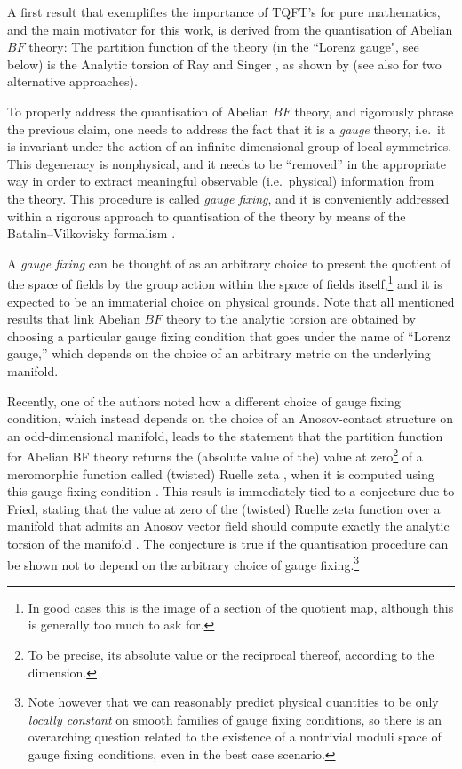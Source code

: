 \documentclass[reqno]{amsart}
\theoremstyle{definition}
\theoremstyle{remark}
\begin{document}
A first result that exemplifies the importance of TQFT's for pure mathematics, and the main motivator for this work, is derived from the quantisation of Abelian $BF$ theory:  The partition function of the theory (in the ``Lorenz gauge", see below) is the Analytic torsion of Ray and Singer \cite{ray_singer}, as shown by \cite{schwarz1,schwarz2} (see also \cite{cattaneo2017cellular,hadfield_kandel_schiavina} for two alternative approaches).

To properly address the quantisation of Abelian $BF$ theory, and rigorously phrase the previous claim, one needs to address the fact that it is a \emph{gauge} theory, i.e.\ it is invariant under the action of an infinite dimensional group of local symmetries. This degeneracy is nonphysical, and it needs to be ``removed'' in the appropriate way in order to extract meaningful observable (i.e.\ physical) information from the theory. This procedure is called \emph{gauge fixing}, and it is conveniently addressed within a rigorous approach to quantisation of the theory by means of the Batalin--Vilkovisky formalism \cite{BV81,BV83}. 

A \emph{gauge fixing} can be thought of as an arbitrary choice to present the quotient of the space of fields by the group action within the space of fields itself,\footnote{In good cases this is the image of a section of the quotient map, although this is generally too much to ask for.} and it is expected to be an immaterial choice on physical grounds. Note that all mentioned results that link Abelian $BF$ theory to the analytic torsion are obtained by choosing a particular gauge fixing condition that goes under the name of ``Lorenz gauge,'' which depends on the choice of an arbitrary metric on the underlying manifold.

Recently, one of the authors noted how a different choice of gauge fixing condition, which instead depends on the choice of an Anosov-contact structure on an odd-dimensional manifold, leads to the statement that the partition function for Abelian BF theory returns the (absolute value of the) value at zero\footnote{To be precise, its absolute value or the reciprocal thereof, according to the dimension.} of a meromorphic function called (twisted) Ruelle zeta \cite{ruelle}, when it is computed using this gauge fixing condition \cite{hadfield_kandel_schiavina}. This result is immediately tied to a conjecture due to Fried, stating that the value at zero of the (twisted) Ruelle zeta function over a manifold that admits an Anosov vector field should compute exactly the analytic torsion of the manifold \cite{fried,fried1987lefschetz}. The conjecture is true if the quantisation procedure can be shown not to depend on the arbitrary choice of gauge fixing.\footnote{Note however that we can reasonably predict physical quantities to be only \emph{locally constant} on smooth families of gauge fixing conditions, so there is an overarching question related to the existence of a nontrivial moduli space of gauge fixing conditions, even in the best case scenario.}
\end{document}
